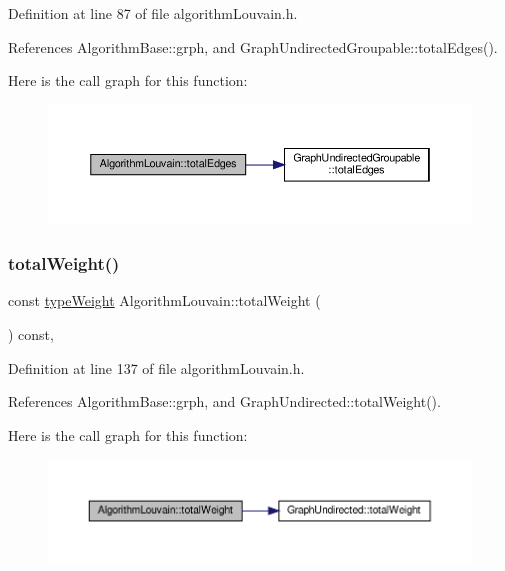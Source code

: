 Definition at line 87 of file algorithm\+Louvain.\+h.



References Algorithm\+Base\+::grph, and Graph\+Undirected\+Groupable\+::total\+Edges().

Here is the call graph for this function\+:
\nopagebreak
\begin{figure}[H]
\begin{center}
\leavevmode
\includegraphics[width=350pt]{classAlgorithmLouvain_a36a6536611d7c97d16f93245e2271867_cgraph}
\end{center}
\end{figure}
\mbox{\label{classAlgorithmLouvain_a6b38d3b1af94bb426b953473aa5647a4}} 
\subsubsection{\texorpdfstring{total\+Weight()}{totalWeight()}}
{\footnotesize\ttfamily const \hyperlink{edge_8h_a2e7ea3be891ac8b52f749ec73fee6dd2}{type\+Weight} Algorithm\+Louvain\+::total\+Weight (\begin{DoxyParamCaption}{ }\end{DoxyParamCaption}) const\hspace{0.3cm}{\ttfamily [inline]}, {\ttfamily [private]}}



Definition at line 137 of file algorithm\+Louvain.\+h.



References Algorithm\+Base\+::grph, and Graph\+Undirected\+::total\+Weight().

Here is the call graph for this function\+:
\nopagebreak
\begin{figure}[H]
\begin{center}
\leavevmode
\includegraphics[width=350pt]{classAlgorithmLouvain_a6b38d3b1af94bb426b953473aa5647a4_cgraph}
\end{center}
\end{figure}
\mbox{\label{classAlgorithmLouvain_a24c9f6d44d422eee2307c55540a8273c}} 
